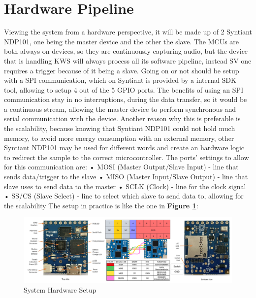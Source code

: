 \section{Hardware Pipeline}
\label{sec:hw pipeline}
Viewing the system from a hardware perspective, it will be made up of 2 Syntiant NDP101, one being the master device and the other the slave. The MCUs are both always on-devices, so they are continuously capturing audio, but the device that is handling KWS will always process all its software pipeline, instead SV one requires a trigger because of it being a slave. Going on or not should be setup with a SPI communication, which on Syntiant is provided by a internal SDK tool, allowing to setup 4 out of the 5 GPIO ports. The benefits of using an SPI communication stay in no interruptions, during the data transfer, so it would be a continuous stream, allowing the master device to perform synchronous and serial communication with the device. Another reason why this is preferable is the scalability, because knowing that Syntiant NDP101 could not hold much memory, to avoid more energy consumption with an external memory, other Syntiant NDP101 may be used for different words and create an hardware logic to redirect the sample to the correct microcontroller. The ports' settings to allow for this communication are:\newline
• MOSI (Master Output/Slave Input) - line that sends data/trigger to the slave\newline
• MISO (Master Input/Slave Output) - line that slave uses to send data to the master\newline
• SCLK (Clock) - line for the clock signal\newline 
• SS/CS (Slave Select) - line to select which slave to send data to, allowing for the scalability\newline
The setup in practice is like the one in \textbf{Figure \ref{fig:hardware setup}}:\newline
\begin{center}
    \centering
    \begin{figure}[!h]
        \includegraphics[width=1.0\textwidth]{images/4.05 Hardware Pipeline 2 NDP101.png}
        \caption{System Hardware Setup}
         \label{fig:hardware setup}
    \end{figure}
\end{center}
